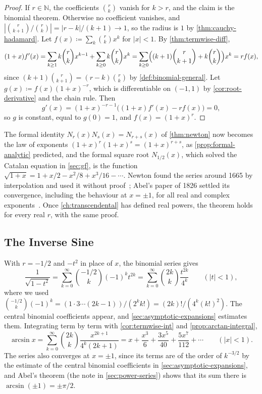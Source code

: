 \begin{proof}
If $r\in\mathbb N$, the coefficients $\binom rk$ vanish for $k>r$, and the claim is the binomial theorem. Otherwise no coefficient vanishes, and $|\binom r{k+1}/\binom rk|=|r-k|/(k+1)\to1$, so the radius is $1$ by \cref{thm:cauchy-hadamard}. Let $f(x)\coloneqq\sum_k\binom rkx^k$ for $|x|<1$. By \cref{thm:termwise-diff},
\[
(1+x)f'(x)=\sum_{k\ge1}k\binom rkx^{k-1}+\sum_{k\ge0}k\binom rkx^k=\sum_{k\ge0}\Bigl((k+1)\binom r{k+1}+k\binom rk\Bigr)x^k=rf(x),
\]
since $(k+1)\binom r{k+1}=(r-k)\binom rk$ by \cref{def:binomial-general}. Let $g(x)\coloneqq f(x)(1+x)^{-r}$, which is differentiable on $(-1,1)$ by \cref{cor:root-derivative} and the chain rule. Then
\[
g'(x)=(1+x)^{-r-1}\bigl((1+x)f'(x)-rf(x)\bigr)=0 ,
\]
so $g$ is constant, equal to $g(0)=1$, and $f(x)=(1+x)^r$.
\end{proof}

The formal identity $N_r(x)N_s(x)=N_{r+s}(x)$ of \cref{thm:newton} now becomes the law of exponents $(1+x)^r(1+x)^s=(1+x)^{r+s}$, as \cref{prop:formal-analytic} predicted, and the formal square root $N_{1/2}(x)$, which solved the Catalan equation in \cref{sec:gf}, is the function $\sqrt{1+x}=1+x/2-x^2/8+x^3/16-\cdots$. Newton found the series around 1665 by interpolation and used it without proof~\cite{edwards1979}; Abel's paper of 1826 settled its convergence, including the behaviour at $x=\pm1$, for all real and complex exponents~\cite{abel1826}. Once \cref{ch:transcendental} has defined real powers, the theorem holds for every real $r$, with the same proof.

\subsection{The Inverse Sine}

With $r=-1/2$ and $-t^2$ in place of $x$, the binomial series gives
\[
\frac1{\sqrt{1-t^2}}=\sum_{k=0}^\infty\binom{-1/2}k(-1)^kt^{2k}=\sum_{k=0}^\infty\binom{2k}k\frac{t^{2k}}{4^k}\qquad(|t|<1),
\]
where we used $\binom{-1/2}k(-1)^k=(1\cdot3\cdots(2k-1))/(2^kk!)=(2k)!/(4^k(k!)^2)$. The central binomial coefficients appear, and \cref{sec:asymptotic-expansions} estimates them. Integrating term by term with \cref{cor:termwise-int} and \cref{prop:arctan-integral},
\[
\arcsin x=\sum_{k=0}^\infty\binom{2k}k\frac{x^{2k+1}}{4^k(2k+1)}=x+\frac{x^3}6+\frac{3x^5}{40}+\frac{5x^7}{112}+\cdots\qquad(|x|<1).
\]
The series also converges at $x=\pm1$, since its terms are of the order of $k^{-3/2}$ by the estimate of the central binomial coefficients in \cref{sec:asymptotic-expansions}, and Abel's theorem (the note in \cref{sec:power-series}) shows that its sum there is $\arcsin(\pm1)=\pm\pi/2$.

